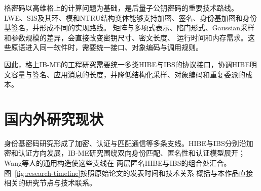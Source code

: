 格密码以高维格上的计算问题为基础，是后量子公钥密码的重要技术路线。LWE、SIS及其环、模和NTRU结构变体能够支持加密、签名、身份基加密和身份基签名，并形成不同的实现路线。
矩阵与多项式表示、陷门形式、Gaussian采样和参数规模的差异，会直接改变密钥尺寸、密文长度、
运行时间和内存需求。这些原语进入同一软件时，需要统一接口、对象编码与调用规则。

因此，格上IB-ME的工程研究需要统一多类HIBE与IBS的协议接口，协调HIBE明文容量与签名、应用消息的长度，并降低结构化采样、对象编码和重复委派的成本。

\section{国内外研究现状}

身份基密码研究形成了加密、认证与匹配通信等多条支线。HIBE与IBS分别沿加密和认证方向发展，IB-ME研究围绕双向身份匹配、匿名性和认证模型展开；Wang等人的通用构造使这些支线在
两层匿名HIBE与IBS的组合处汇合。图~\ref{fig:research-timeline}按照原始论文的发表时间和技术关系
概括与本作品直接相关的研究节点与技术联系。

